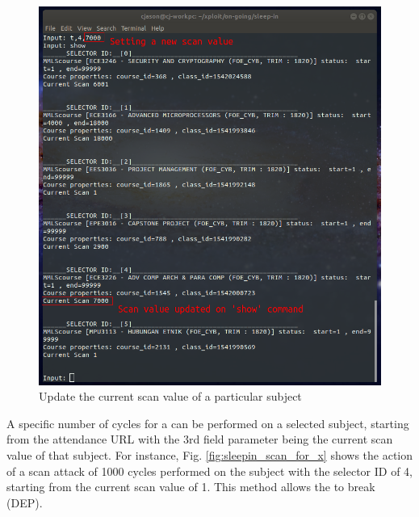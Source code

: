 \documentclass[runningheads]{llncs}
\begin{document}
\begin{figure}
\includegraphics[width=\textwidth]{imgres/sleepin_update_scanval.png}
\caption{Update the current scan value of a particular subject} 
\label{fig:sleepin_update_scan_value}
\end{figure}

A specific number of cycles for a \scanattack{} can be performed on a selected subject, starting from the attendance URL with the 3rd field parameter being the current scan value of that subject. For instance, Fig. \ref{fig:sleepin_scan_for_x} shows the action of a scan attack of 1000 cycles performed on the subject with the selector ID of 4, starting from the current scan value of 1. This method allows the \scanattack{} to break (DEP).
\end{document}
